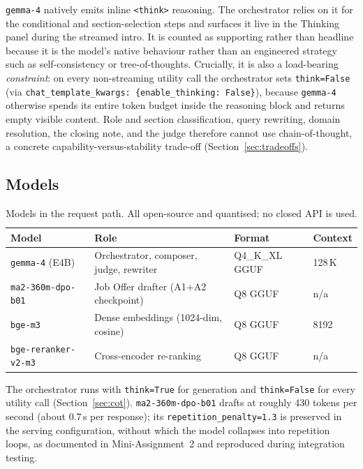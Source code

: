 \verb|gemma-4| natively emits inline \verb|<think>| reasoning. The orchestrator relies on
it for the conditional and section-selection steps and surfaces it live in the Thinking
panel during the streamed intro. It is counted as supporting rather than headline because
it is the model's native behaviour rather than an engineered strategy such as
self-consistency or tree-of-thoughts. Crucially, it is also a load-bearing
\emph{constraint}: on every non-streaming utility call the orchestrator sets
\verb|think=False| (via \verb|chat_template_kwargs: {enable_thinking: False}|), because
\verb|gemma-4| otherwise spends its entire token budget inside the reasoning block and
returns empty visible content. Role and section classification, query rewriting, domain
resolution, the closing note, and the judge therefore cannot use chain-of-thought, a
concrete capability-versus-stability trade-off (Section~\ref{sec:tradeoffs}).

\subsection{Models}

\begin{table}[h]
\centering
\caption{Models in the request path. All open-source and quantised; no closed API is used.}
\begin{tabular}{llll}
\toprule
\textbf{Model} & \textbf{Role} & \textbf{Format} & \textbf{Context} \\
\midrule
\texttt{gemma-4} (E4B)       & Orchestrator, composer, judge, rewriter & Q4\_K\_XL GGUF & 128\,K \\
\texttt{ma2-360m-dpo-b01}    & Job Offer drafter (A1+A2 checkpoint)    & Q8 GGUF        & n/a    \\
\texttt{bge-m3}              & Dense embeddings (1024-dim, cosine)     & Q8 GGUF        & 8192   \\
\texttt{bge-reranker-v2-m3}  & Cross-encoder re-ranking                & Q8 GGUF        & n/a    \\
\bottomrule
\end{tabular}
\end{table}

The orchestrator runs with \verb|think=True| for generation and \verb|think=False| for
every utility call (Section~\ref{sec:cot}). \verb|ma2-360m-dpo-b01| drafts at roughly 430
tokens per second (about 0.7\,s per response); its \verb|repetition_penalty=1.3| is
preserved in the serving configuration, without which the model collapses into repetition
loops, as documented in Mini-Assignment~2 and reproduced during integration testing.
